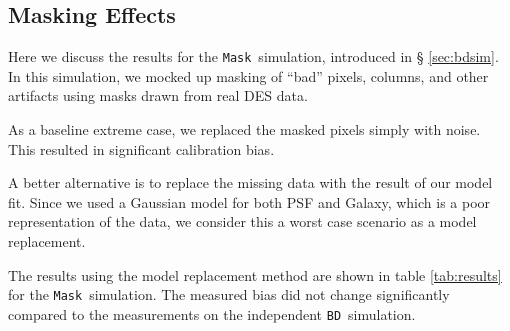 \documentclass[usegraphicx,usenatbib]{mn2e}
\newcommand{\mcal}{metacalibration}
\newcommand{\mcalR}{$R$}
\newcommand{\bdsim}{\texttt{BD}}
\newcommand{\bdmask}{\texttt{Mask}}
\begin{document}

\subsection{Masking Effects} \label{sec:masking}

Here we discuss the results for the \bdmask\ simulation, introduced in \S
\ref{sec:bdsim}.  In this simulation, we mocked up masking of ``bad'' pixels,
columns, and other artifacts using masks drawn from real DES data.

As a baseline extreme case, we replaced the masked pixels simply with noise.
This resulted in significant calibration bias.


A better alternative is to replace the missing data with the result of our
model fit.  Since we used a Gaussian model for both PSF and Galaxy, which is a
poor representation of the data, we consider this a worst case scenario as a
model replacement. 

The results using the model replacement method are shown in table
\ref{tab:results} for the \bdmask\ simulation.  The measured bias did not
change significantly compared to the measurements on the independent \bdsim\
simulation.
\end{document}
